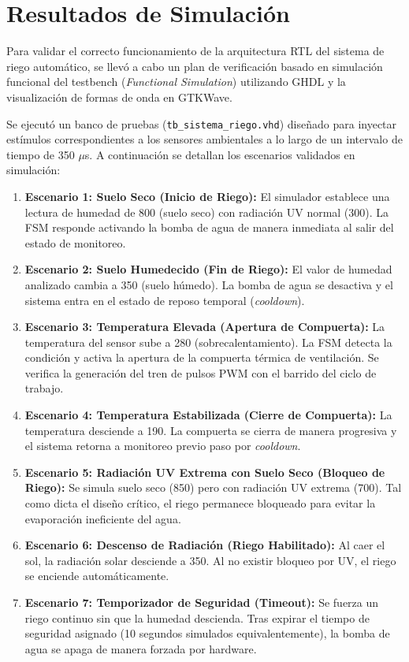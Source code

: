 \section{Resultados de Simulación}

Para validar el correcto funcionamiento de la arquitectura RTL del sistema de riego automático, se llevó a cabo un plan de verificación basado en simulación funcional del testbench (\textit{Functional Simulation}) utilizando GHDL y la visualización de formas de onda en GTKWave.

Se ejecutó un banco de pruebas (\texttt{tb\_sistema\_riego.vhd}) diseñado para inyectar estímulos correspondientes a los sensores ambientales a lo largo de un intervalo de tiempo de 350 $\mu$s. A continuación se detallan los escenarios validados en simulación:

\begin{enumerate}
	\item \textbf{Escenario 1: Suelo Seco (Inicio de Riego):} El simulador establece una lectura de humedad de 800 (suelo seco) con radiación UV normal (300). La FSM responde activando la bomba de agua de manera inmediata al salir del estado de monitoreo.
	\item \textbf{Escenario 2: Suelo Humedecido (Fin de Riego):} El valor de humedad analizado cambia a 350 (suelo húmedo). La bomba de agua se desactiva y el sistema entra en el estado de reposo temporal (\textit{cooldown}).
	\item \textbf{Escenario 3: Temperatura Elevada (Apertura de Compuerta):} La temperatura del sensor sube a 280 (sobrecalentamiento). La FSM detecta la condición y activa la apertura de la compuerta térmica de ventilación. Se verifica la generación del tren de pulsos PWM con el barrido del ciclo de trabajo.
	\item \textbf{Escenario 4: Temperatura Estabilizada (Cierre de Compuerta):} La temperatura desciende a 190. La compuerta se cierra de manera progresiva y el sistema retorna a monitoreo previo paso por \textit{cooldown}.
	\item \textbf{Escenario 5: Radiación UV Extrema con Suelo Seco (Bloqueo de Riego):} Se simula suelo seco (850) pero con radiación UV extrema (700). Tal como dicta el diseño crítico, el riego permanece bloqueado para evitar la evaporación ineficiente del agua.
	\item \textbf{Escenario 6: Descenso de Radiación (Riego Habilitado):} Al caer el sol, la radiación solar desciende a 350. Al no existir bloqueo por UV, el riego se enciende automáticamente.
	\item \textbf{Escenario 7: Temporizador de Seguridad (Timeout):} Se fuerza un riego continuo sin que la humedad descienda. Tras expirar el tiempo de seguridad asignado (10 segundos simulados equivalentemente), la bomba de agua se apaga de manera forzada por hardware.
\end{enumerate}

